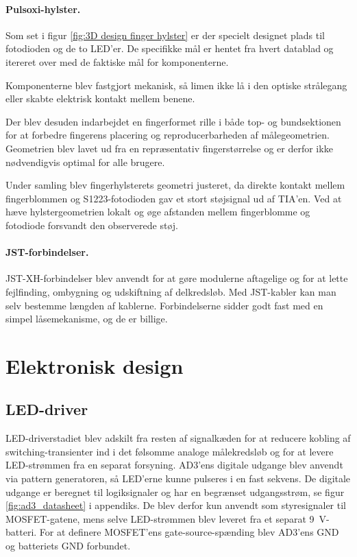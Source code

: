 \paragraph{Pulsoxi-hylster.} Som set i figur \ref{fig:3D design finger hylster} er der specielt designet plads til fotodioden og de to LED'er. De specifikke mål er hentet fra hvert datablad og itereret over med de faktiske mål for komponenterne.

Komponenterne blev fastgjort mekanisk, så limen ikke lå i den optiske strålegang eller skabte elektrisk kontakt mellem benene.

Der blev desuden indarbejdet en fingerformet rille i både top- og bundsektionen for at forbedre fingerens placering og reproducerbarheden af målegeometrien. Geometrien blev lavet ud fra en repræsentativ fingerstørrelse og er derfor ikke nødvendigvis optimal for alle brugere.

Under samling blev fingerhylsterets geometri justeret, da direkte kontakt mellem fingerblommen og S1223-fotodioden gav et stort støjsignal ud af TIA'en. Ved at hæve hylstergeometrien lokalt og øge afstanden mellem fingerblomme og fotodiode forsvandt den observerede støj.

\paragraph{JST-forbindelser.} JST-XH-forbindelser blev anvendt for at gøre modulerne aftagelige og for at lette fejlfinding, ombygning og udskiftning af delkredsløb. Med JST-kabler kan man selv bestemme længden af kablerne. Forbindelserne sidder godt fast med en simpel låsemekanisme, og de er billige.

\section{Elektronisk design}
\label{sec:electrical_design}

\subsection{LED-driver}

LED-driverstadiet blev adskilt fra resten af signalkæden for at reducere kobling af switching-transienter ind i det følsomme analoge målekredsløb og for at levere LED-strømmen fra en separat forsyning. AD3'ens digitale udgange blev anvendt via pattern generatoren, så LED'erne kunne pulseres i en fast sekvens. De digitale udgange er beregnet til logiksignaler og har en begrænset udgangsstrøm, se figur \ref{fig:ad3_datasheet} i appendiks. De blev derfor kun anvendt som styresignaler til MOSFET-gatene, mens selve LED-strømmen blev leveret fra et separat \SI{9}{V}-batteri. For at definere MOSFET'ens gate-source-spænding blev AD3'ens GND og batteriets GND forbundet.

